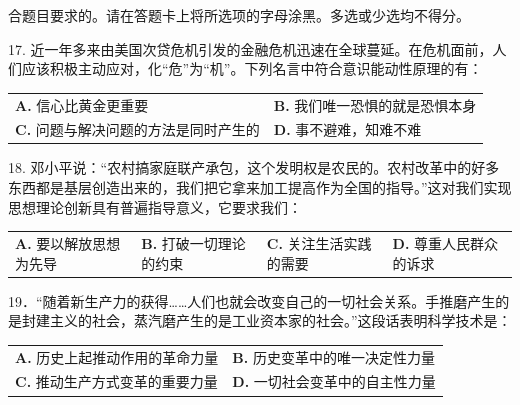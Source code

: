 \documentclass[UTF8,11pt]{ctexart}
\begin{document}
合题目要求的。请在答题卡上将所选项的字母涂黑。多选或少选均不得分。


17. 近一年多来由美国次贷危机引发的金融危机迅速在全球蔓延。在危机面前，人们应该积极主动应对，化“危”为“机”。下列名言中符合意识能动性原理的有：


\begin{center}\begin{tabular}{>{\raggedright\arraybackslash}p{\dimexpr(\linewidth-4\tabcolsep)/2\relax}>{\raggedright\arraybackslash}p{\dimexpr(\linewidth-4\tabcolsep)/2\relax}}
\textbf{A.} 信心比黄金更重要 & \textbf{B.} 我们唯一恐惧的就是恐惧本身\\[.35em]
\textbf{C.} 问题与解决问题的方法是同时产生的 & \textbf{D.} 事不避难，知难不难\\[.35em]\end{tabular}\end{center}

18. 邓小平说：“农村搞家庭联产承包，这个发明权是农民的。农村改革中的好多东西都是基层创造出来的，我们把它拿来加工提高作为全国的指导。”这对我们实现思想理论创新具有普遍指导意义，它要求我们：


\begin{center}\begin{tabular}{>{\raggedright\arraybackslash}p{\dimexpr(\linewidth-8\tabcolsep)/4\relax}>{\raggedright\arraybackslash}p{\dimexpr(\linewidth-8\tabcolsep)/4\relax}>{\raggedright\arraybackslash}p{\dimexpr(\linewidth-8\tabcolsep)/4\relax}>{\raggedright\arraybackslash}p{\dimexpr(\linewidth-8\tabcolsep)/4\relax}}
\textbf{A.} 要以解放思想为先导 & \textbf{B.} 打破一切理论的约束 & \textbf{C.} 关注生活实践的需要 & \textbf{D.} 尊重人民群众的诉求\\[.35em]\end{tabular}\end{center}

19．“随着新生产力的获得……人们也就会改变自己的一切社会关系。手推磨产生的是封建主义的社会，蒸汽磨产生的是工业资本家的社会。”这段话表明科学技术是：


\begin{center}\begin{tabular}{>{\raggedright\arraybackslash}p{\dimexpr(\linewidth-4\tabcolsep)/2\relax}>{\raggedright\arraybackslash}p{\dimexpr(\linewidth-4\tabcolsep)/2\relax}}
\textbf{A.} 历史上起推动作用的革命力量 & \textbf{B.} 历史变革中的唯一决定性力量\\[.35em]
\textbf{C.} 推动生产方式变革的重要力量 & \textbf{D.} 一切社会变革中的自主性力量\\[.35em]\end{tabular}\end{center}
\end{document}
